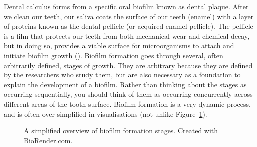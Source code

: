 \documentclass[
  b5paper,
]{book}
\begin{document}
Dental calculus forms from a specific oral biofilm known as dental
plaque. After we clean our teeth, our saliva coats the surface of our
teeth (enamel) with a layer of proteins known as the dental pellicle (or
acquired enamel pellicle). The pellicle is a film that protects our
teeth from both mechanical wear and chemical decay, but in doing so,
provides a viable surface for microorganisms to attach and initiate
biofilm growth (). Biofilm formation goes through several, often arbitrarily
defined, stages of growth. They are arbitrary because they are defined
by the researchers who study them, but are also necessary as a
foundation to explain the development of a biofilm. Rather than thinking
about the stages as occurring sequentially, you should think of them as
occurring concurrently across different areas of the tooth surface.
Biofilm formation is a very dynamic process, and is often
over-simplified in visualisations (not unlike
Figure~\ref{fig-biofilm-form}).

\begin{figure}


\caption{\label{fig-biofilm-form}A simplified overview of biofilm
formation stages. Created with BioRender.com.}

\end{figure}%
\end{document}

